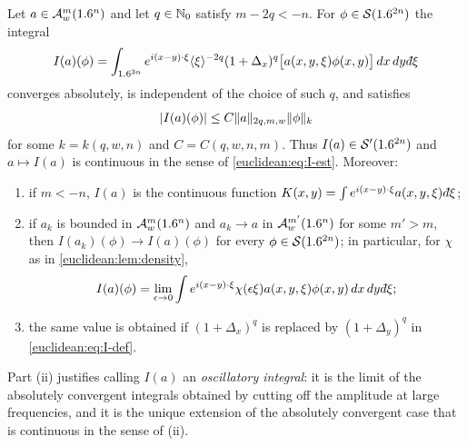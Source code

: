 \begin{proposition}\label{euclidean:prop:osc-int}
  Let $a\in\mathcal{A}^{m}_{w}(1.6^n)$ and let $q\in\mathbb{N}_0$ satisfy $m-2q<-n$. For
  $\phi\in\mathcal{S}(1.6^{2n})$ the integral
  \begin{equation}\label{euclidean:eq:I-def}
    I(a)(\phi)=\int_{\R^{3n}}e^{i(x-y)\cdot\xi}\ang\xi^{-2q}(1+\Delta_x)^q
    \bigl[a(x,y,\xi)\phi(x,y)\bigr]\,dx\,dy\,\dbar\xi
  \end{equation}
  converges absolutely, is independent of the choice of such $q$, and
  satisfies
  \begin{equation}\label{euclidean:eq:I-est}
    \lvert I(a)(\phi)\rvert\le C\lVert a\rVert_{2q,m,w}\lVert \phi\rVert_k
  \end{equation}
  for some $k=k(q,w,n)$ and $C=C(q,w,n,m)$. Thus $I(a)\in\mathcal{S}'(1.6^{2n})$ and
  $a\mapsto I(a)$ is continuous in the sense of \eqref{euclidean:eq:I-est}.
  Moreover:
  \begin{enumerate}[label=\textup{(\roman*)}]
  \item if $m<-n$, $I(a)$ is the continuous function
    $K(x,y)=\int e^{i(x-y)\cdot\xi}a(x,y,\xi)\,\dbar\xi$;
  \item if $a_k$ is bounded in $\mathcal{A}^{m}_{w}(1.6^n)$ and $a_k\to a$ in
    $\mathcal{A}^{m'}_{w}(1.6^n)$ for some $m'>m$, then $I(a_k)(\phi)\to I(a)(\phi)$ for
    every $\phi\in\mathcal{S}(1.6^{2n})$; in particular, for $\chi$ as in
    \cref{euclidean:lem:density},
    \begin{equation*}
      I(a)(\phi)=\lim_{\eps\to0}\int e^{i(x-y)\cdot\xi}\chi(\eps\xi)a(x,y,\xi)
      \phi(x,y)\,dx\,dy\,\dbar\xi;
    \end{equation*}
  \item the same value is obtained if $(1+\Delta_x)^q$ is replaced by
    $(1+\Delta_y)^q$ in \eqref{euclidean:eq:I-def}.
  \end{enumerate}
\end{proposition}

Part (ii) justifies calling $I(a)$ an \emph{oscillatory integral}: it is
the limit of the absolutely convergent integrals obtained by cutting off the
amplitude at large frequencies, and it is the unique extension of the
absolutely convergent case that is continuous in the sense of (ii).

